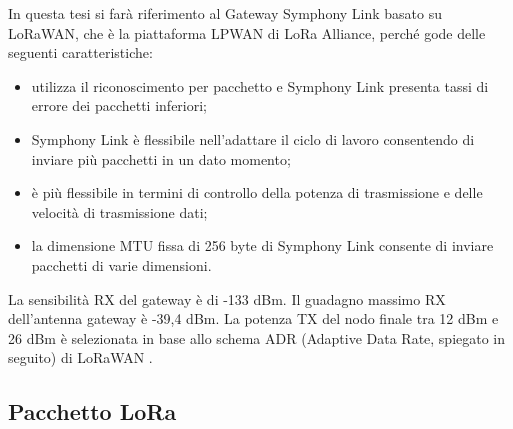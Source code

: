 \documentclass[a4paper]{report} %
\begin{document}
In questa tesi si farà riferimento al Gateway Symphony Link basato su LoRaWAN, che è la piattaforma LPWAN di LoRa Alliance, perché gode delle seguenti caratteristiche:
\begin{itemize}
\item utilizza il riconoscimento per pacchetto e Symphony Link presenta tassi di errore dei pacchetti inferiori;
\item Symphony Link è flessibile nell'adattare il ciclo di lavoro consentendo di inviare più pacchetti in un dato momento;
\item è più flessibile in termini di controllo della potenza di trasmissione e delle velocità di trasmissione dati;
\item la dimensione MTU fissa di 256 byte di Symphony Link consente di inviare pacchetti di varie dimensioni.
\end{itemize}
La sensibilità RX del gateway è di -133 dBm. Il guadagno massimo RX dell'antenna gateway è -39,4 dBm. La potenza TX del nodo finale tra 12 dBm e 26 dBm è selezionata in base allo schema ADR (Adaptive Data Rate, spiegato in seguito) di LoRaWAN \cite{art:rif.47}. 

\subsection{Pacchetto LoRa}
\end{document}
